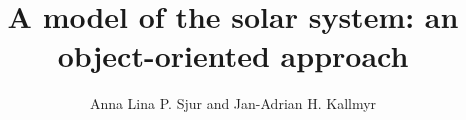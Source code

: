 \documentclass[a4paper, 11pt, twocolumn]{article}
\begin{document}
\title{A model of the solar system: an object-oriented approach}

\author{Anna Lina P. Sjur and Jan-Adrian H. Kallmyr}

\twocolumn[
  \begin{@twocolumnfalse}
    \maketitle
    
  \end{@twocolumnfalse}
]










%
%


\end{document}
